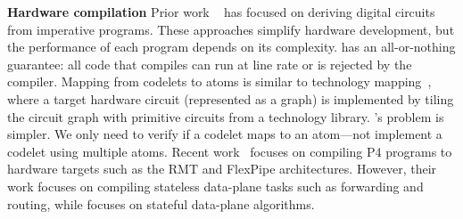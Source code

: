 \textbf{Hardware compilation}
Prior work ~\cite{nurvadathi, cash, bluespec} has focused on deriving digital
circuits from imperative programs. These approaches simplify hardware
development, but the performance of each program depends on its complexity.
\pktlanguage has an all-or-nothing guarantee: all code that compiles can run at
line rate or is rejected by the compiler.  Mapping from codelets to atoms is
similar to technology mapping~\cite{micheli, flowmap, spectransform}, where a
target hardware circuit (represented as a graph) is implemented by tiling the
circuit graph with primitive circuits from a technology library. \pktlanguage's
problem is simpler. We only need to verify if a codelet maps to an atom---not
implement a codelet using multiple atoms.  Recent work~\cite{lavanya_compiler}
focuses on compiling P4 programs to hardware targets such as the RMT and
FlexPipe architectures. However, their work focuses on compiling stateless
data-plane tasks such as forwarding and routing, while \pktlanguage focuses on
stateful data-plane algorithms.
